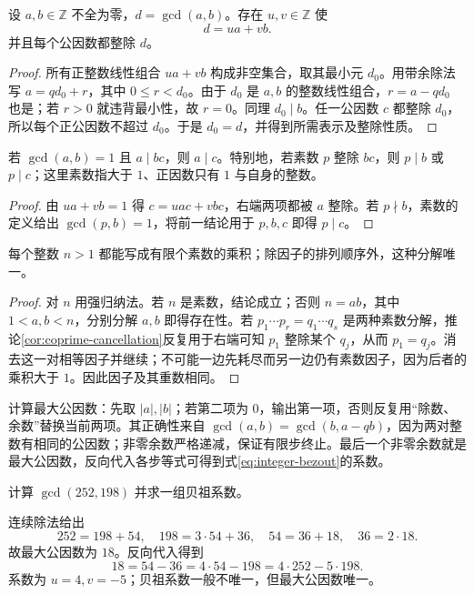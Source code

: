 \documentclass[UTF8,12pt,a4paper,fontset=fandol]{ctexbook}
\begin{document}
\begin{theorem}[贝祖等式]\label{thm:integer-bezout}
设 $a,b\in\mathbb Z$ 不全为零，$d=\gcd(a,b)$。存在 $u,v\in\mathbb Z$ 使
\begin{equation}\label{eq:integer-bezout}
  d=ua+vb.
\end{equation}
并且每个公因数都整除 $d$。
\end{theorem}
\begin{proof}
所有正整数线性组合 $ua+vb$ 构成非空集合，取其最小元 $d_0$。用带余除法写 $a=qd_0+r$，其中 $0\leq r<d_0$。由于 $d_0$ 是 $a,b$ 的整数线性组合，$r=a-qd_0$ 也是；若 $r>0$ 就违背最小性，故 $r=0$。同理 $d_0\mid b$。任一公因数 $c$ 都整除 $d_0$，所以每个正公因数不超过 $d_0$。于是 $d_0=d$，并得到所需表示及整除性质。
\end{proof}

\begin{corollary}[互素消去与欧几里得引理]\label{cor:coprime-cancellation}
若 $\gcd(a,b)=1$ 且 $a\mid bc$，则 $a\mid c$。特别地，若素数 $p$ 整除 $bc$，则 $p\mid b$ 或 $p\mid c$；这里素数指大于 $1$、正因数只有 $1$ 与自身的整数。
\end{corollary}
\begin{proof}
由 $ua+vb=1$ 得 $c=uac+vbc$，右端两项都被 $a$ 整除。若 $p\nmid b$，素数的定义给出 $\gcd(p,b)=1$，将前一结论用于 $p,b,c$ 即得 $p\mid c$。
\end{proof}

\begin{theorem}[整数的唯一素因子分解]\label{thm:integer-factorization}
每个整数 $n>1$ 都能写成有限个素数的乘积；除因子的排列顺序外，这种分解唯一。
\end{theorem}
\begin{proof}
对 $n$ 用强归纳法。若 $n$ 是素数，结论成立；否则 $n=ab$，其中 $1<a,b<n$，分别分解 $a,b$ 即得存在性。若 $p_1\cdots p_r=q_1\cdots q_s$ 是两种素数分解，推论\ref{cor:coprime-cancellation}反复用于右端可知 $p_1$ 整除某个 $q_j$，从而 $p_1=q_j$。消去这一对相等因子并继续；不可能一边先耗尽而另一边仍有素数因子，因为后者的乘积大于 $1$。因此因子及其重数相同。
\end{proof}

计算最大公因数：先取 $|a|,|b|$；若第二项为 $0$，输出第一项，否则反复用“除数、余数”替换当前两项。其正确性来自 $\gcd(a,b)=\gcd(b,a-qb)$，因为两对整数有相同的公因数；非零余数严格递减，保证有限步终止。最后一个非零余数就是最大公因数，反向代入各步等式可得到式\eqref{eq:integer-bezout}的系数。

\begin{example}[求最大公因数与贝祖系数]\label{ex:euclidean-algorithm}
计算 $\gcd(252,198)$ 并求一组贝祖系数。
\end{example}
\begin{solve}
连续除法给出
\[
  252=198+54,\quad 198=3\cdot54+36,\quad
  54=36+18,\quad 36=2\cdot18.
\]
故最大公因数为 $18$。反向代入得到
\[
  18=54-36=4\cdot54-198=4\cdot252-5\cdot198.
\]
系数为 $u=4,v=-5$；贝祖系数一般不唯一，但最大公因数唯一。
\end{solve}
\end{document}
